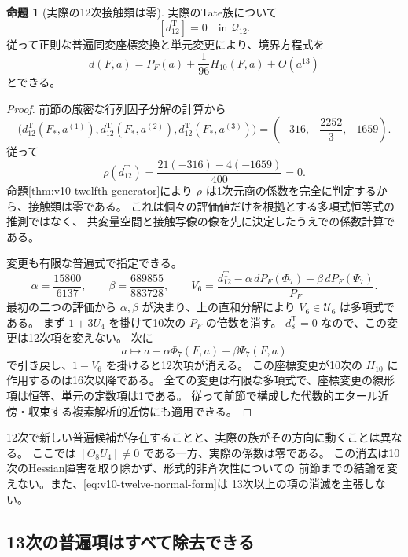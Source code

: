 \documentclass[a4paper,11pt]{ltjsarticle}
\theoremstyle{definition}
\newtheorem{theorem}{命題}[section]
\begin{document}
\begin{theorem}[実際の12次接触類は零]
\label{thm:v10-actual-twelfth-zero}
実際のTate族について
\[
 [d^{\mathrm T}_{12}]=0\quad\text{in }\mathcal Q_{12}.
\]
従って正則な普遍同変座標変換と単元変更により、境界方程式を
\begin{equation}\label{eq:v10-twelve-normal-form}
 d(F,a)=P_F(a)+\frac1{96}H_{10}(F,a)+O(a^{13})
\end{equation}
とできる。
\end{theorem}
\begin{proof}
前節の厳密な行列因子分解の計算から
\[
 \bigl(d^{\mathrm T}_{12}(F_*,a^{(1)}),
       d^{\mathrm T}_{12}(F_*,a^{(2)}),
       d^{\mathrm T}_{12}(F_*,a^{(3)})\bigr)
 =\left(-316,-\frac{2252}{3},-1659\right).
\]
従って
\[
 \rho(d^{\mathrm T}_{12})
 =\frac{21(-316)-4(-1659)}{400}=0.
\]
命題\ref{thm:v10-twelfth-generator}により $\rho$ は1次元商の係数を完全に判定するから、接触類は零である。
これは個々の評価値だけを根拠とする多項式恒等式の推測ではなく、
共変量空間と接触写像の像を先に決定したうえでの係数計算である。

変更も有限な普遍式で指定できる。
\[
 \alpha=\frac{15800}{6137},\qquad
 \beta=\frac{689855}{883728},\qquad
 V_6=\frac{d^{\mathrm T}_{12}
       -\alpha\,dP_F(\Phi_7)-\beta\,dP_F(\Psi_7)}{P_F}.
\]
最初の二つの評価から $\alpha,\beta$ が決まり、上の直和分解により
$V_6\in\mathcal U_6$ は多項式である。
まず $1+3U_4$ を掛けて10次の $P_F$ の倍数を消す。
$d^{\mathrm T}_8=0$ なので、この変更は12次項を変えない。
次に
\[
 a\longmapsto a-\alpha\Phi_7(F,a)-\beta\Psi_7(F,a)
\]
で引き戻し、$1-V_6$ を掛けると12次項が消える。
この座標変更が10次の $H_{10}$ に作用するのは16次以降である。
全ての変更は有限な多項式で、座標変更の線形項は恒等、単元の定数項は1である。
従って前節で構成した代数的エタール近傍・収束する複素解析的近傍にも適用できる。
\end{proof}

12次で新しい普遍候補が存在することと、実際の族がその方向に動くことは異なる。
ここでは $[\Theta_8U_4]\ne0$ である一方、実際の係数は零である。
この消去は10次のHessian障害を取り除かず、形式的非斉次性についての
前節までの結論を変えない。また、\eqref{eq:v10-twelve-normal-form}は
13次以上の項の消滅を主張しない。


\subsection{13次の普遍項はすべて除去できる}
\label{subsec:v10-degree-thirteen}
\end{document}
